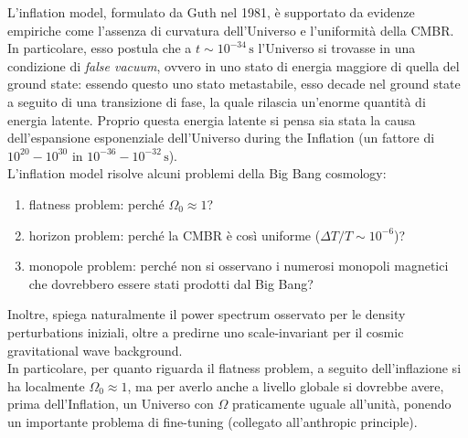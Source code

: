 L'inflation model, formulato da Guth nel 1981, è supportato da evidenze empiriche come l'assenza di curvatura dell'Universo e l'uniformità della CMBR. In particolare, esso postula che a $ t \sim 10^{-34} \,\text{s} $ l'Universo si trovasse in una condizione di \textit{false vacuum}, ovvero in uno stato di energia maggiore di quella del ground state: essendo questo uno stato metastabile, esso decade nel ground state a seguito di una transizione di fase, la quale rilascia un'enorme quantità di energia latente. Proprio questa energia latente si pensa sia stata la causa dell'espansione esponenziale dell'Universo during the Inflation (un fattore di $ 10^{20} - 10^{30} $ in $ 10^{-36} - 10^{-32} \,\text{s} $).\\
L'inflation model risolve alcuni problemi della Big Bang cosmology:
\begin{enumerate}
	\item flatness problem: perché $ \Omega_0 \approx 1 $?
	\item horizon problem: perché la CMBR è così uniforme ($ \Delta T / T \sim 10^{-6} $)?
	\item monopole problem: perché non si osservano i numerosi monopoli magnetici che dovrebbero essere stati prodotti dal Big Bang?
\end{enumerate}
Inoltre, spiega naturalmente il power spectrum osservato per le density perturbations iniziali, oltre a predirne uno scale-invariant per il cosmic gravitational wave background.\\
In particolare, per quanto riguarda il flatness problem, a seguito dell'inflazione si ha localmente $ \Omega_0 \approx 1 $, ma per averlo anche a livello globale si dovrebbe avere, prima dell'Inflation, un Universo con $ \Omega $ praticamente uguale all'unità, ponendo un importante problema di fine-tuning (collegato all'anthropic principle).










